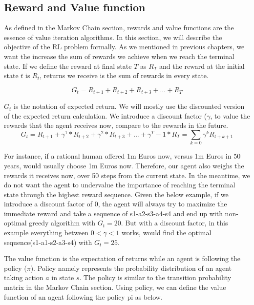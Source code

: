 \subsection{Reward and Value function}

As defined in the Markov Chain section, rewards and value functions are the essence of value iteration algorithms. In this section, we will describe the objective of the RL problem formally. As we mentioned in previous chapters, we want the increase the sum of rewards we achieve when we reach the terminal state. If we define the reward at final state \(T\) as \(R_T\) and the reward at the initial state \(t\) is \(R_t\), returns we receive is the sum of rewards in every state.

\begin{equation}
    G_t = R_{t+1} + R_{t+2} + R_{t+3} + ... + R_T    
\end{equation}


\(G_t\) is the notation of expected return. We will mostly use the discounted version of the expected return calculation. We introduce a discount factor (\(\gamma\), to value the rewards that the agent receives now, compare to the rewards in the future. 
\begin{equation}
    G_t = R_{t+1} + \gamma^1*R_{t+2} + \gamma^2*R_{t+3} + ... + \gamma^T-1*R_T = \sum\limits_{k=0}\gamma^kR_{t+k+1}
\end{equation}

For instance, if a rational human offered 1m Euros now, versus 1m Euros in 50 years, would usually choose 1m Euros now. Therefore, our agent also weighs the rewards it receives now, over 50 steps from the current state.  In the meantime, we do not want the agent to undervalue the importance of reaching the terminal state through the highest reward sequence.  Given the below example, if we introduce a discount factor of 0, the agent will always try to maximize the immediate reward and take a sequence of s1-a2-s3-a4-s4 and end up with non-optimal greedy algorithm with \(G_t = 20 \). But with a discount factor, in this example everything between \(0< \gamma < 1\) works, would find the optimal sequence(s1-a1-s2-a3-s4) with \(G_t = 25\).

The value function is the expectation of returns while an agent is following the policy (\(\pi\)). Policy namely represents the probability distribution of an agent taking action \(a\) in state \(s\). The policy is similar to the transition probability matrix in the Markov Chain section. Using policy, we can define the value function of an agent following the policy pi as below.
